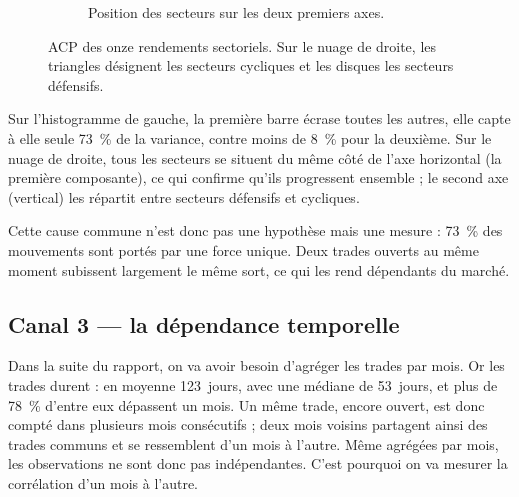 \begin{figure}[H]
\begin{subfigure}[b]{0.50\linewidth}
\caption{Position des secteurs sur les deux premiers axes.}
\label{fig:acp-nuage}
\end{subfigure}
\caption{ACP des onze rendements sectoriels. Sur le nuage de droite, les
triangles désignent les secteurs cycliques et les disques les secteurs
défensifs.}
\label{fig:acp-marche}
\end{figure}

Sur l'histogramme de gauche, la première barre écrase toutes les autres,
elle capte à elle seule 73~\% de la variance, contre moins de 8~\% pour la
deuxième. Sur le nuage de droite, tous les secteurs se situent du même côté
de l'axe horizontal (la première composante), ce qui confirme qu'ils
progressent ensemble ; le second axe (vertical) les répartit entre secteurs
défensifs et cycliques.

Cette cause commune n'est donc pas une hypothèse mais une mesure : 73~\% des
mouvements sont portés par une force unique. Deux trades ouverts au même
moment subissent largement le même sort, ce qui les rend dépendants du marché.

\subsection{Canal 3 --- la dépendance temporelle}
\label{sec:dep-canal3}


Dans la suite du rapport, on va avoir besoin d'agréger les trades par mois.
Or les trades durent : en moyenne 123~jours, avec une médiane de 53~jours,
et plus de 78~\% d'entre eux dépassent un mois. Un même trade, encore ouvert,
est donc compté dans plusieurs mois consécutifs ; deux mois voisins partagent
ainsi des trades communs et se ressemblent d'un mois à l'autre.
Même agrégées par mois, les observations ne sont donc pas indépendantes.
C'est pourquoi on va mesurer la corrélation d'un mois à l'autre.

